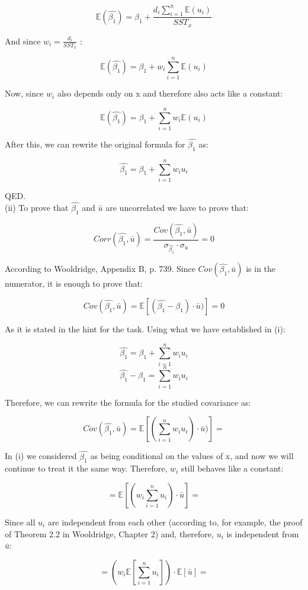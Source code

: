 \documentclass{article}
\begin{document}
$$\mathbb{E}(\hat{\beta_1}) = \beta_1 + \frac{d_i \sum_{i=1}^{n}\mathbb{E}(u_i)}{SST_x}$$

And since $w_i = \frac{d_i}{SST_x}$ : 

$$\mathbb{E}(\hat{\beta_1}) = \beta_1 + w_i\sum_{i=1}^{n}\mathbb{E}(u_i)$$

Now, since $w_i$ also depends only on x and therefore also acts like a constant:

$$\mathbb{E}(\hat{\beta_1}) = \beta_1 + \sum_{i=1}^{n} w_i\mathbb{E}(u_i)$$

After this, we can rewrite the original formula for $\hat{\beta_1}$ as:

$$\hat{\beta_1} = \beta_1 + \sum_{i=1}^{n} w_i u_i$$

QED.
\\

(ii) To prove that $\hat{\beta_1}$ and $\bar{u}$ are uncorrelated we have to prove that:

$$ Corr( \hat{\beta_1}, \bar{u} ) = \frac{Cov(\hat{\beta_1}, \bar{u})}{\sigma_{\hat{\beta_1}} \cdot \sigma_{\bar{u}}} = 0$$

According to Wooldridge, Appendix B, p. 739. Since $Cov(\hat{\beta_1}, \bar{u})$ is in the numerator, it is enough to prove that:

$$ Cov(\hat{\beta_1}, \bar{u}) = \mathbb{E}[(\hat{\beta_1} - \beta_1) \cdot \bar{u})] = 0$$

As it is stated in the hint for the task. Using what we have established in (i):

$$\hat{\beta_1} = \beta_1 + \sum_{i=1}^{n} w_i u_i$$
$$\hat{\beta_1} - \beta_1 = \sum_{i=1}^{n} w_i u_i$$

Therefore, we can rewrite the formula for the studied covariance as:

$$ Cov(\hat{\beta_1}, \bar{u}) = \mathbb{E}[(\sum_{i=1}^{n} w_i u_i) \cdot \bar{u})] =$$

In (i) we considered $\hat{\beta_1}$ as being conditional on the values of x, and now we will continue to treat it the same way. Therefore, $w_i$ still behaves like a constant:

$$= \mathbb{E}[(w_i \sum_{i=1}^{n} u_i) \cdot \bar{u}] =$$

Since all $u_i$ are independent from each other (according to, for example, the proof of Theorem 2.2 in Wooldridge, Chapter 2) and, therefore, $u_i$ is independent from $\bar{u}$: 

$$= (w_i \mathbb{E}[\sum_{i=1}^{n} u_i]) \cdot \mathbb{E}[\bar{u}] = $$
\end{document}
